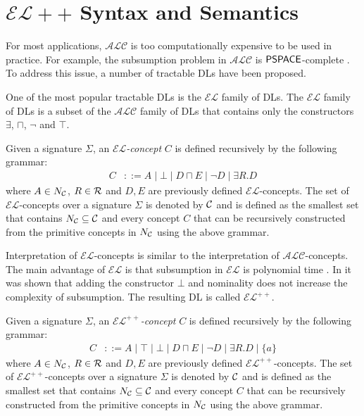 \section{$\mathcal{EL}++$ Syntax and Semantics}
\label{sec:existential_language}
For most applications, $\mathcal{ALC}$ 
is too computationally expensive to be used in practice. 
For example, the subsumption problem in 
$\mathcal{ALC}$ is 
$\mathsf{PSPACE}$-complete 
\cite{ALCcomplexity}.
To address this issue,
a number of tractable DLs have been proposed.

One of the most popular tractable DLs is the
$\mathcal{EL}$ family of DLs.
The $\mathcal{EL}$ family of DLs is a subset of the $\mathcal{ALC}$ family of DLs
that contains only the constructors $\exists$, $\sqcap$, $\neg$ and $\top$.

\begin{definition}[EL Concept]
    Given a signature $\Sigma$, an \emph{$\mathcal{EL}$-concept} $C$ is defined recursively by the following grammar:
    \begin{align*}
        C &::= A \mid \bot \mid D \sqcap E \mid \neg D \mid \exists R.D
    \end{align*}
    where $A \in N_{\mathcal{C}}$, $R \in \mathcal{R}$ and $D, E$ are previously defined $\mathcal{EL}$-concepts.
    The set of $\mathcal{EL}$-concepts over a signature $\Sigma$ is denoted by $\mathcal{C}$ and is defined as the smallest 
    set that contains $N_{\mathcal{C}} \subseteq \mathcal{C}$ and every concept $C$ that can be recursively constructed 
    from the primitive concepts in $N_{\mathcal{C}}$ using the above grammar.
\end{definition}
Interpretation of $\mathcal{EL}$-concepts is similar to the interpretation of $\mathcal{ALC}$-concepts.
The main advantage of $\mathcal{EL}$ is that subsumption in $\mathcal{EL}$ is polynomial time \cite{ELcomplexity}.
In \cite{EL++complexity} it was shown that adding the constructor $\bot$ and nominality does not increase the complexity of subsumption.
The resulting DL is called $\mathcal{EL}^{++}$.

\begin{definition}
    Given a signature $\Sigma$, an \emph{$\mathcal{EL}^{++}$-concept} $C$ is defined recursively by the following grammar:
    \begin{align*}
        C &::= A \mid \top \mid \bot \mid D \sqcap E \mid \neg D \mid \exists R.D \mid \{a\}
    \end{align*}
    where $A \in N_{\mathcal{C}}$, $R \in \mathcal{R}$ and $D, E$ are previously defined $\mathcal{EL}^{++}$-concepts.
    The set of $\mathcal{EL}^{++}$-concepts over a signature $\Sigma$ is denoted by $\mathcal{C}$ and is defined as the smallest 
    set that contains $N_{\mathcal{C}} \subseteq \mathcal{C}$ and every concept $C$ that can be recursively constructed 
    from the primitive concepts in $N_{\mathcal{C}}$ using the above grammar.
\end{definition}